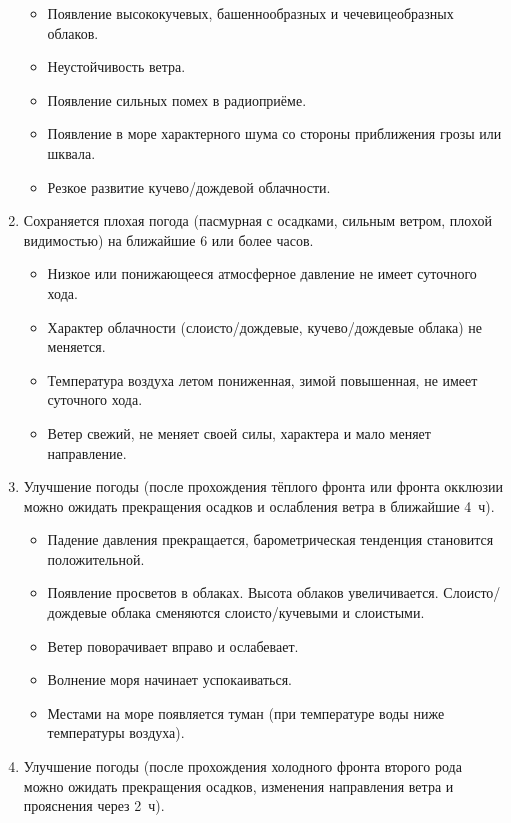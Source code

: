 \begin{enumerate}
\begin{itemize}
  \item Появление высококучевых, башеннообразных и чечевицеобразных
    облаков.
  \item Неустойчивость ветра.
  \item Появление сильных помех в радиоприёме.
  \item Появление в море характерного шума со стороны приближения
    грозы или шквала.
  \item Резкое развитие кучево\-/дождевой облачности.
  \end{itemize}
\item Сохраняется плохая погода (пасмурная с осадками, сильным ветром,
  плохой видимостью) на ближайшие 6 или более часов.
  \begin{itemize}
  \item Низкое или понижающееся атмосферное давление не имеет суточного хода.
  \item Характер облачности (слоисто\-/дождевые, кучево\-/дождевые
    облака) не меняется.
  \item Температура воздуха летом пониженная, зимой повышенная, не
    имеет суточного хода.
  \item Ветер свежий, не меняет своей силы, характера и мало меняет
    направление.
  \end{itemize}
\item Улучшение погоды (после прохождения тёплого фронта или фронта
  окклюзии можно ожидать прекращения осадков и ослабления ветра в
  ближайшие 4~ч).
  \begin{itemize}
  \item Падение давления прекращается, барометрическая тенденция
    становится положительной.
  \item Появление просветов в облаках. Высота облаков
    увеличивается. Слоисто\-/дождевые облака сменяются
    слоисто\-/кучевыми и слоистыми.
  \item Ветер поворачивает вправо и ослабевает.
  \item Волнение моря начинает успокаиваться.
  \item Местами на море появляется туман (при температуре воды ниже
    температуры воздуха).
  \end{itemize}
\item Улучшение погоды (после прохождения холодного фронта второго
  рода можно ожидать прекращения осадков, изменения направления ветра
  и прояснения через 2~ч).
  \begin{itemize}

\end{itemize}
\end{enumerate}
